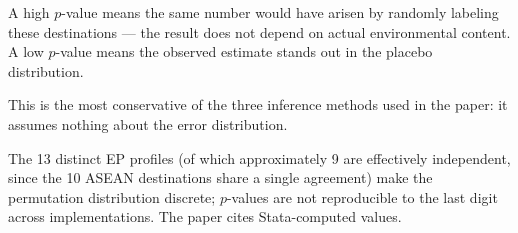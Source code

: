 \begin{table}[htbp]
\begin{threeparttable}
\begin{tablenotes}[flushleft]
\item A high $p$-value means the same number would have arisen by randomly labeling these destinations --- the result does not depend on actual environmental content. A low $p$-value means the observed estimate stands out in the placebo distribution.
\item This is the most conservative of the three inference methods used in the paper: it assumes nothing about the error distribution.
\item The 13 distinct EP profiles (of which approximately 9 are effectively independent, since the 10 ASEAN destinations share a single agreement) make the permutation distribution discrete; $p$-values are not reproducible to the last digit across implementations. The paper cites Stata-computed values.
\end{tablenotes}
\end{threeparttable}
\end{table}
